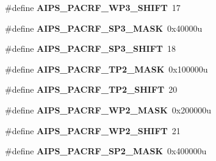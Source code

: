 \begin{DoxyCompactItemize}
\item 
\#define {\bfseries A\+I\+P\+S\+\_\+\+P\+A\+C\+R\+F\+\_\+\+W\+P3\+\_\+\+S\+H\+I\+FT}~17\hypertarget{group__AIPS__Register__Masks_gafa982aaf35911424279b47dd9e54eadb}{}\label{group__AIPS__Register__Masks_gafa982aaf35911424279b47dd9e54eadb}

\item 
\#define {\bfseries A\+I\+P\+S\+\_\+\+P\+A\+C\+R\+F\+\_\+\+S\+P3\+\_\+\+M\+A\+SK}~0x40000u\hypertarget{group__AIPS__Register__Masks_ga74184dc3f39e20c8f9434dcac5060d2f}{}\label{group__AIPS__Register__Masks_ga74184dc3f39e20c8f9434dcac5060d2f}

\item 
\#define {\bfseries A\+I\+P\+S\+\_\+\+P\+A\+C\+R\+F\+\_\+\+S\+P3\+\_\+\+S\+H\+I\+FT}~18\hypertarget{group__AIPS__Register__Masks_ga73ae357e5b43a447abf64beaa615c037}{}\label{group__AIPS__Register__Masks_ga73ae357e5b43a447abf64beaa615c037}

\item 
\#define {\bfseries A\+I\+P\+S\+\_\+\+P\+A\+C\+R\+F\+\_\+\+T\+P2\+\_\+\+M\+A\+SK}~0x100000u\hypertarget{group__AIPS__Register__Masks_gafaccdf2fddd8d63f8180d9e56f921a9b}{}\label{group__AIPS__Register__Masks_gafaccdf2fddd8d63f8180d9e56f921a9b}

\item 
\#define {\bfseries A\+I\+P\+S\+\_\+\+P\+A\+C\+R\+F\+\_\+\+T\+P2\+\_\+\+S\+H\+I\+FT}~20\hypertarget{group__AIPS__Register__Masks_ga983b0e1aaae08c8b403e1f005301da2d}{}\label{group__AIPS__Register__Masks_ga983b0e1aaae08c8b403e1f005301da2d}

\item 
\#define {\bfseries A\+I\+P\+S\+\_\+\+P\+A\+C\+R\+F\+\_\+\+W\+P2\+\_\+\+M\+A\+SK}~0x200000u\hypertarget{group__AIPS__Register__Masks_ga3d3a86b85f34c9744b470e2cd2ff6b00}{}\label{group__AIPS__Register__Masks_ga3d3a86b85f34c9744b470e2cd2ff6b00}

\item 
\#define {\bfseries A\+I\+P\+S\+\_\+\+P\+A\+C\+R\+F\+\_\+\+W\+P2\+\_\+\+S\+H\+I\+FT}~21\hypertarget{group__AIPS__Register__Masks_gad0d4a8aa4280ac15edde751626588663}{}\label{group__AIPS__Register__Masks_gad0d4a8aa4280ac15edde751626588663}

\item 
\#define {\bfseries A\+I\+P\+S\+\_\+\+P\+A\+C\+R\+F\+\_\+\+S\+P2\+\_\+\+M\+A\+SK}~0x400000u\hypertarget{group__AIPS__Register__Masks_gaf3f8e1a91ecb9d68f8738c8a5dc0dcbe}{}\label{group__AIPS__Register__Masks_gaf3f8e1a91ecb9d68f8738c8a5dc0dcbe}


\end{DoxyCompactItemize}
